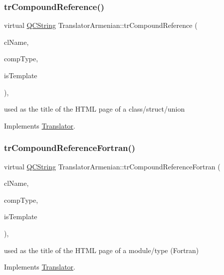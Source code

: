 \subsubsection{\texorpdfstring{trCompoundReference()}{trCompoundReference()}}
{\footnotesize\ttfamily virtual \mbox{\hyperlink{class_q_c_string}{Q\+C\+String}} Translator\+Armenian\+::tr\+Compound\+Reference (\begin{DoxyParamCaption}\item[{const char $\ast$}]{cl\+Name,  }\item[{\mbox{\hyperlink{class_class_def_ae70cf86d35fe954a94c566fbcfc87939}{Class\+Def\+::\+Compound\+Type}}}]{comp\+Type,  }\item[{bool}]{is\+Template }\end{DoxyParamCaption})\hspace{0.3cm}{\ttfamily [inline]}, {\ttfamily [virtual]}}

used as the title of the H\+T\+ML page of a class/struct/union 

Implements \mbox{\hyperlink{class_translator}{Translator}}.

\mbox{\label{class_translator_armenian_ab342c20027d5d3bb6a53c7c35981459c}} 
\subsubsection{\texorpdfstring{trCompoundReferenceFortran()}{trCompoundReferenceFortran()}}
{\footnotesize\ttfamily virtual \mbox{\hyperlink{class_q_c_string}{Q\+C\+String}} Translator\+Armenian\+::tr\+Compound\+Reference\+Fortran (\begin{DoxyParamCaption}\item[{const char $\ast$}]{cl\+Name,  }\item[{\mbox{\hyperlink{class_class_def_ae70cf86d35fe954a94c566fbcfc87939}{Class\+Def\+::\+Compound\+Type}}}]{comp\+Type,  }\item[{bool}]{is\+Template }\end{DoxyParamCaption})\hspace{0.3cm}{\ttfamily [inline]}, {\ttfamily [virtual]}}

used as the title of the H\+T\+ML page of a module/type (Fortran) 

Implements \mbox{\hyperlink{class_translator}{Translator}}.

